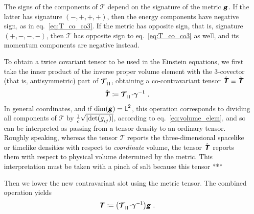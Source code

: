 \documentclass[\ifafour a4paper,12pt,\else a5paper,10pt,\fi%
onecolumn,oneside,article,%
british%
]{memoir}
\makeatletter
\theoremstyle{remark}
\theoremstyle{innote}
\newcommand*{\mathte}[1]{\textbf{\textit{\textsf{#1}}}}
\newcommand*{\defd}{\coloneqq}
\DeclarePairedDelimiter\abs{\lvert}{\rvert}
\renewcommand*{\|}[1][]{\nonscript\,#1\vert\nonscript\;\mathopen{}}
\newcommand*{\eqn}{eq.}%
\newcommand*{\q}{}%
\DeclareRobustCommand*{\q}{%
  \mathord{\mathpalette\bigcdot@{}}%
}
\newcommand*{\bigcdot@scalefactor}{0.7}
\newcommand*{\bigcdot@widthfactor}{1.5}
\newcommand*{\bigcdot@}[2]{%
  \sbox0{$#1\vcenter{}$}%
  \sbox2{$#1\cdot\m@th$}%
  \hbox to \bigcdot@widthfactor\wd2{%
    \hfil
    \raise\ht0\hbox{%
      \scalebox{\bigcdot@scalefactor}{%
        \lower\ht0\hbox{$#1\bullet\m@th$}%
      }%
    }%
    \hfil
  }%
}
\newcommand*{\Le}{\textsf{L}}
\newcommand*{\ii}{\mathbin{\!\cdot\!}}
\newcommand*{\rii}{\ii}
\newcommand*{\yg}{\mathte{g}}
\newcommand*{\yT}{\bm{\mathcal{T}}}
\newcommand*{\yTc}{\Hat{\mathte{T}}}
\newcommand*{\yTe}{\mathte{T}}
\renewcommand*{\i}{\indices}
\newcommand*{\ygv}{\bm{\gamma}}
\newcommand*{\rul}{{\mkern2mu\rule[-0.1ex]{0.75pt}{1.1ex}\mkern2mu}}
\DeclarePairedDelimiter\mul{\rul}{\rul}%
\makeatother
\begin{document}
The signs of the components of $\yT$ depend on the signature of the metric
$\yg$. If the latter has signature $(-,+,+,+)$, then the energy components
have negative sign, as in \eqn~\eqref{eq:T_co_co3}. If the metric has
opposite sign, that is, signature $(+,-,-,-)$, then $\yT$ has opposite sign
to \eqn~\eqref{eq:T_co_co3} as well, and its momentum components are
negative instead.

\medskip

To obtain a twice covariant tensor to be used in the Einstein equations, we
first take the inner product of the inverse proper volume element with the
3-covector (that is, antisymmetric) part of $\yT\i{_{\q \mul{\q\q\q}}}$,
obtaining a co-contravariant tensor $\yTc \equiv
\yTc{}\i{_{\q}^{\q}}$
\begin{equation}
  \label{eq:T-co_contra}
  \yTc \defd \yT\i{_{\q\mul{\q\q\q}}} \rii \ygv^{-1} \ .
\end{equation}
In general coordinates, and if $\dim(\yg)=\Le^{2}$, this operation
corresponds to dividing all components of $\yT$ by
$\frac{1}{c}\sqrt{\smash[b]{\abs{\det(g\i{_{ij}})}}}$, according to
\eqn~\eqref{eq:volume_elem}, and so can be interpreted as passing from a
tensor density to an ordinary tensor. Roughly speaking, whereas the tensor
$\yT$ reports the three-dimensional spacelike or timelike densities with
respect to \emph{coordinate} volume, the tensor $\yTc$ reports them with
respect to physical volume determined by the metric. This interpretation
must be taken with a pinch of salt because this tensor ***

Then we lower the new contravariant
slot using the metric tensor. The combined operation yields
\begin{gather}
  \label{eq:co_co_T}
  \yTe\i{_{\q\q}} \defd
  \bigl(\yT\i{_{\q\mul{\q\q\q}}} \rii \ygv^{-1} \bigr) \yg \ .
\end{gather}
\end{document}
